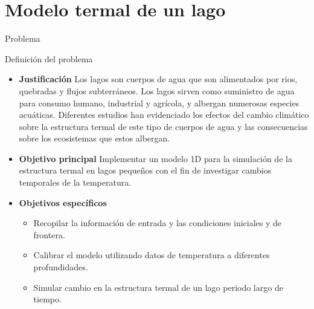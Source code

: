 \documentclass[
10pt,
aspectratio=169,
]{beamer}
\begin{document}
\section{Modelo termal de un lago}
\begin{frame}{Problema}

\begin{block}{Definición del problema}
\begin{itemize}
\item \textbf{Justificación}
Los lagos son cuerpos de agua que son alimentados por rios, quebradas y flujos subterráneos. Los lagos sirven como suministro de agua para consumo humano, industrial y agrícola, y albergan numerosas especies acuáticas. Diferentes estudios han evidenciado los efectos del cambio climático sobre la estructura termal de este tipo de cuerpos de agua y las consecuencias sobre los ecosistemas que estos albergan. 
\item \textbf{Objetivo principal}
Implementar un modelo 1D para la simulación de la estructura termal en lagos pequeños con el fin de investigar cambios temporales de la temperatura.
\item \textbf{Objetivos específicos}
\begin{itemize}
\item Recopilar la información de entrada y las condiciones iniciales y de frontera.
\item Calibrar el modelo utilizando datos de temperatura a diferentes profundidades.
\item Simular cambio en la estructura termal de un lago periodo largo de tiempo.
\end{itemize}
\end{itemize}
\end{block}
\end{frame}
\end{document}

